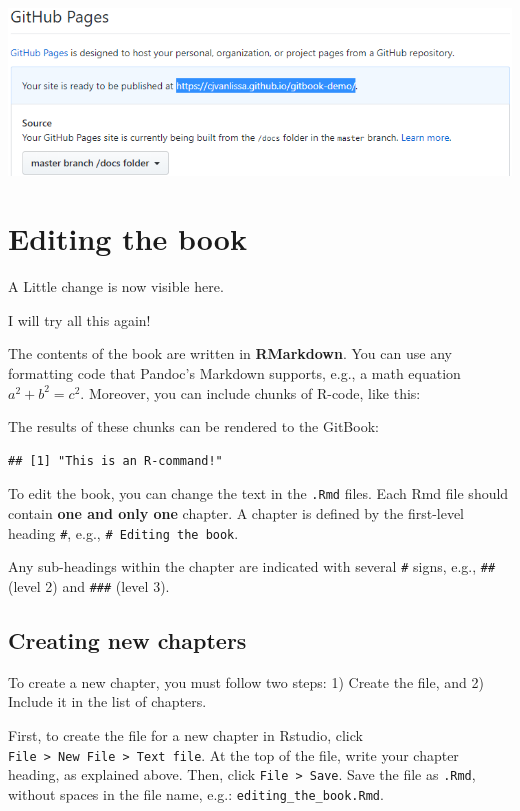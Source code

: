 \documentclass[
]{book}
\begin{document}
\begin{enumerate}
  \includegraphics{./img/pages_published.png}
\end{enumerate}

\hypertarget{editing-the-book}{%
\chapter{Editing the book}\label{editing-the-book}}

A Little change is now visible here.

I will try all this again!

The contents of the book are written in \textbf{RMarkdown}. You can use any formatting code that Pandoc's Markdown supports, e.g., a math equation \(a^2 + b^2 = c^2\). Moreover, you can include chunks of R-code, like this:

The results of these chunks can be rendered to the GitBook:

\begin{verbatim}
## [1] "This is an R-command!"
\end{verbatim}

To edit the book, you can change the text in the \texttt{.Rmd} files. Each Rmd file should contain \textbf{one and only one} chapter. A chapter is defined by the first-level heading \texttt{\#}, e.g., \texttt{\#\ Editing\ the\ book}.

Any sub-headings within the chapter are indicated with several \texttt{\#} signs, e.g., \texttt{\#\#} (level 2) and \texttt{\#\#\#} (level 3).

\hypertarget{creating-new-chapters}{%
\section{Creating new chapters}\label{creating-new-chapters}}

To create a new chapter, you must follow two steps: 1) Create the file, and 2) Include it in the list of chapters.

First, to create the file for a new chapter in Rstudio, click \texttt{File\ \textgreater{}\ New\ File\ \textgreater{}\ Text\ file}. At the top of the file, write your chapter heading, as explained above. Then, click \texttt{File\ \textgreater{}\ Save}. Save the file as \texttt{.Rmd}, without spaces in the file name, e.g.: \texttt{editing\_the\_book.Rmd}.
\end{document}
